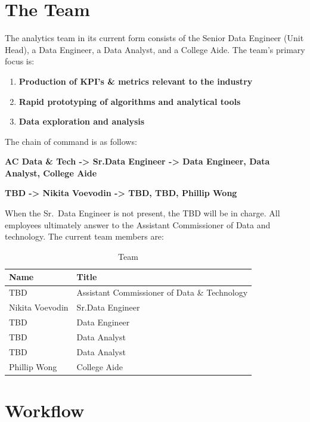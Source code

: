 \documentclass[
]{book}
\providecommand{\tightlist}{%
  \setlength{\itemsep}{0pt}\setlength{\parskip}{0pt}}
\begin{document}
\hypertarget{the-team}{%
\chapter{The Team}\label{the-team}}

The analytics team in its current form consists of the Senior Data Engineer (Unit Head), a Data Engineer, a Data Analyst, and a College Aide. The team's primary focus is:

\begin{enumerate}
\def\labelenumi{\arabic{enumi}.}
\tightlist
\item
  \textbf{Production of KPI's \& metrics relevant to the industry}
\item
  \textbf{Rapid prototyping of algorithms and analytical tools}
\item
  \textbf{Data exploration and analysis}
\end{enumerate}

The chain of command is as follows:

\textbf{AC Data \& Tech -\textgreater{} Sr.Data Engineer -\textgreater{} Data Engineer, Data Analyst, College Aide}

\textbf{TBD -\textgreater{} Nikita Voevodin -\textgreater{} TBD, TBD, Phillip Wong}

When the Sr.~Data Engineer is not present, the TBD will be in charge. All employees ultimately answer to the Assistant Commissioner of Data and technology. The current team members are:

\begin{longtable}[t]{ll}
\caption{\label{tab:unnamed-chunk-1}Team}\\
\toprule
Name & Title\\
\midrule
TBD & Assistant Commissioner of Data \& Technology\\
Nikita Voevodin & Sr.Data Engineer\\
TBD & Data Engineer\\
TBD & Data Analyst\\
TBD & Data Analyst\\
\addlinespace
Phillip Wong & College Aide\\
\bottomrule
\end{longtable}

\hypertarget{workflow}{%
\chapter{Workflow}\label{workflow}}
\end{document}
